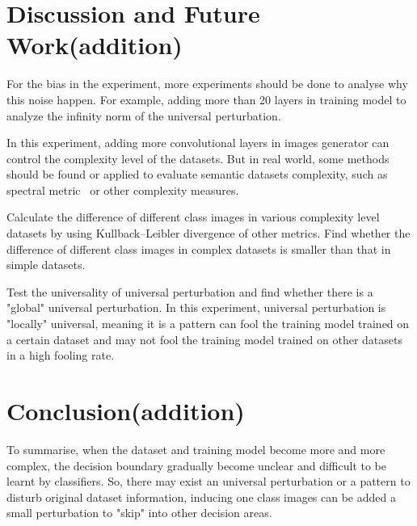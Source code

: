 \documentclass{article}
\begin{document}
\section{Discussion and Future Work(addition)}
For the bias in the experiment, more experiments should be done to analyse why this noise happen. For example, adding more than 20 layers in training model to analyze the infinity norm of the universal perturbation.

In this experiment, adding more convolutional layers in images generator can control the complexity level of the datasets. But in real world, some methods should be found or applied to evaluate semantic datasets complexity, such as spectral metric~\cite{Branchaud-Charron_2019_CVPR} or other complexity measures.

Calculate the difference of different class images in various complexity level datasets by using Kullback–Leibler divergence of other metrics. Find whether the difference of different class images in complex datasets is smaller than that in simple datasets. 

Test the universality of universal perturbation and find whether there is a "global" universal perturbation. In this experiment, universal perturbation is "locally" universal, meaning it is a pattern can fool the training model trained on a certain dataset and may not fool the training model trained on other datasets in a high fooling rate.

\section{Conclusion(addition)}
To summarise, when the dataset and training model become more and more complex, the decision boundary gradually become unclear and difficult to be learnt by classifiers. So, there may exist an universal perturbation or a pattern to disturb original dataset information, inducing one class images can be added a small perturbation to "skip" into other decision areas.

\medskip



\end{document}
